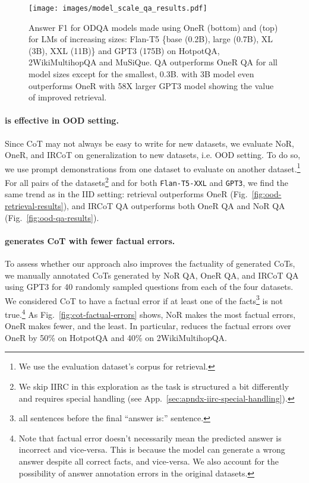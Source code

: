 \begin{figure*}[ht]
\centering
\texttt{[image: images/model\_scale\_qa\_results.pdf]}
\caption{Answer F1 for ODQA models made using OneR (bottom) and \iconsys (top) for LMs of increasing sizes: Flan-T5 \{base (0.2B), large (0.7B), XL (3B), XXL (11B)\} and GPT3 (175B) on HotpotQA, 2WikiMultihopQA and MuSiQue. \iconsys QA outperforms OneR QA for all model sizes except for the smallest, 0.3B. \iconsys with 3B model even outperforms OneR with 58X larger GPT3 model showing the value of improved retrieval.}
\label{fig:model-scale-qa-results}
\end{figure*}

\paragraph{\iconsys is effective in OOD setting. }

Since CoT may not always be easy to write for new datasets, we evaluate NoR, OneR, and IRCoT on generalization to new datasets, i.e. OOD setting. To do so, we use prompt demonstrations from one dataset to evaluate on another dataset.\footnote{We use the evaluation dataset's corpus for retrieval.} For all pairs of the datasets\footnote{We skip IIRC in this exploration as the task is structured a bit differently and requires special handling (see App.~\ref{sec:apndx-iirc-special-handling}).} and for both \texttt{Flan-T5-XXL} and \texttt{GPT3}, we find the same trend as in the IID setting: \iconsys retrieval outperforms OneR (Fig.~\ref{fig:ood-retrieval-results}), and IRCoT QA outperforms both OneR QA and NoR QA (Fig.~\ref{fig:ood-qa-results}).

\paragraph{\iconsys generates CoT with fewer factual errors.}

To assess whether our approach also improves the factuality of generated CoTs, we manually annotated CoTs generated by NoR QA, OneR QA, and IRCoT QA using GPT3 for 40 randomly sampled questions from each of the four datasets. We considered CoT to have a factual error if at least one of the facts\footnote{all sentences before the final ``answer is:'' sentence.} is not true.\footnote{Note that factual error doesn't necessarily mean the predicted answer is incorrect and vice-versa. This is because the model can generate a wrong answer despite all correct facts, and vice-versa. We also account for the possibility of answer annotation errors in the original datasets.} As Fig.~\ref{fig:cot-factual-errors} shows, NoR makes the most factual errors, OneR makes fewer, and \iconsys the least. In particular, \iconsys reduces the factual errors over OneR by 50\% on HotpotQA and 40\% on 2WikiMultihopQA.


